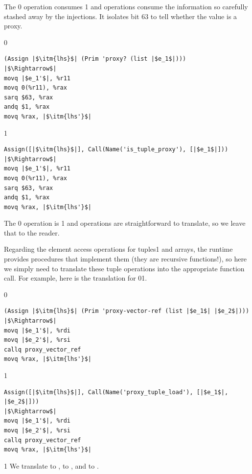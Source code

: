 \documentclass[7x10]{TimesAPriori_MIT}%
\def\racketEd{0}
\def\pythonEd{1}
\providecommand{\BookEdition}{1}
\let\edition\BookEdition
\newcommand{\racket}[1]{{\if\edition\racketEd{#1}\fi}}
\newcommand{\pythonColor}[0]{}
\newcommand{\python}[1]{{\if\edition\pythonEd\pythonColor #1\fi}}
\numberwithin{theorem}{chapter}
\numberwithin{definition}{chapter}
\numberwithin{equation}{chapter}
\begin{document}
The \racket{ operation consumes}%
\python{ and  operations
  consume}
the information so carefully stashed away by the injections.  It
isolates bit $63$ to tell whether the value is a proxy.
%
{\if\edition\racketEd
\begin{lstlisting}
(Assign |$\itm{lhs}$| (Prim 'proxy? (list |$e_1$|)))
|$\Rightarrow$|
movq |$e_1'$|, %r11
movq 0(%r11), %rax
sarq $63, %rax
andq $1, %rax
movq %rax, |$\itm{lhs'}$|
\end{lstlisting}
\fi}%
%
{\if\edition\pythonEd\pythonColor
\begin{lstlisting}
Assign([|$\itm{lhs}$|], Call(Name('is_tuple_proxy'), [|$e_1$|]))
|$\Rightarrow$|
movq |$e_1'$|, %r11
movq 0(%r11), %rax
sarq $63, %rax
andq $1, %rax
movq %rax, |$\itm{lhs'}$|
\end{lstlisting}
\fi}%
%
The \racket{ operation is}
\python{ and  operations are}
straightforward to translate, so we leave that to the reader.

Regarding the element access operations for tuples\python{ and arrays}, the
runtime provides procedures that implement them (they are recursive
functions!), so here we simply need to translate these tuple
operations into the appropriate function call. For example, here is
the translation for
\racket{}\python{}.

{\if\edition\racketEd
\begin{minipage}{0.96\textwidth}
\begin{lstlisting}
(Assign |$\itm{lhs}$| (Prim 'proxy-vector-ref (list |$e_1$| |$e_2$|)))
|$\Rightarrow$|
movq |$e_1'$|, %rdi
movq |$e_2'$|, %rsi
callq proxy_vector_ref
movq %rax, |$\itm{lhs'}$|
\end{lstlisting}
\end{minipage}
\fi}
{\if\edition\pythonEd\pythonColor
\begin{lstlisting}
Assign([|$\itm{lhs}$|], Call(Name('proxy_tuple_load'), [|$e_1$|, |$e_2$|]))
|$\Rightarrow$|
movq |$e_1'$|, %rdi
movq |$e_2'$|, %rsi
callq proxy_vector_ref
movq %rax, |$\itm{lhs'}$|
\end{lstlisting}
\fi}

{\if\edition\pythonEd\pythonColor
We translate 
 to ,
 to , and
 to .
\fi}
\end{document}
